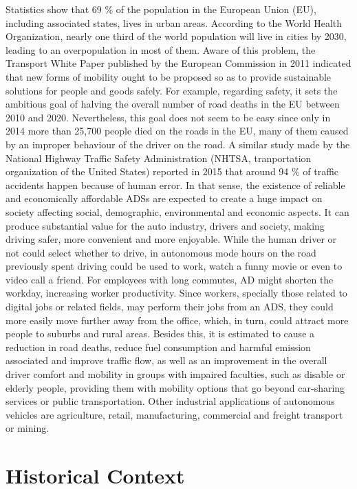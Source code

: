 Statistics show that 69 \% of the population in the European Union (EU), including associated states, lives in urban areas. According to the World Health Organization, nearly one third of the world population will live in cities by 2030, leading to an overpopulation in most of them. Aware of this problem, the Transport White Paper published by the European Commission in 2011 indicated that new forms of mobility ought to be proposed so as to provide sustainable solutions for people and goods safely. For example, regarding safety, it sets the ambitious goal of halving the overall number of road deaths in the EU between 2010 and 2020. Nevertheless, this goal does not seem to be easy since only in 2014 more than 25,700 people died on the roads in the EU, many of them caused by an improper behaviour of the driver on the road. A similar study made by the National Highway Traffic Safety Administration (NHTSA, tranportation organization of the United States) reported in 2015 that around 94 \% of traffic accidents happen because of human error. In that sense, the existence of reliable and economically affordable \acp{ADS} are expected to create a huge impact on society affecting social, demographic, environmental and economic aspects. It can produce substantial value for the auto industry, drivers and society, making driving safer, more convenient and more enjoyable. While the human driver or not could select whether to drive, in autonomous mode hours on the road previously spent driving could be used to work, watch a funny movie or even to video call a friend. For employees with long commutes, \ac{AD} might shorten the workday, increasing worker productivity. Since workers, specially those related to digital jobs or related fields, may perform their jobs from an \ac{ADS}, they could more easily move further away from the office, which, in turn, could attract more people to suburbs and rural areas. Besides this, it is estimated to cause a reduction in road deaths, reduce fuel consumption and harmful emission associated and improve traffic flow, as well as an improvement in the overall driver comfort and mobility in groups with impaired faculties, such as disable or elderly people, providing them with mobility options that go beyond car-sharing services or public transportation. Other industrial applications of autonomous vehicles are agriculture, retail, manufacturing, commercial and freight transport or mining. \\

\section{Historical Context}
\label{sec:1_historical_context}

